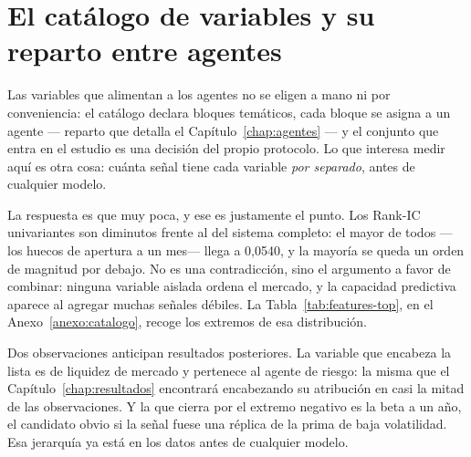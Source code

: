 \section{El catálogo de variables y su reparto entre agentes}

Las variables que alimentan a los agentes no se eligen a mano ni por conveniencia: el catálogo
declara bloques temáticos, cada bloque se asigna a un agente --- reparto que detalla el
Capítulo~\ref{chap:agentes} --- y el conjunto que entra en el estudio es una decisión del propio
protocolo. Lo que interesa medir aquí es otra cosa: cuánta señal tiene cada variable
\emph{por separado}, antes de cualquier modelo.

La respuesta es que muy poca, y ese es justamente el punto. Los Rank-IC univariantes son diminutos
frente al \RankICSeleccion{} del sistema completo: el mayor de todos ---los huecos de apertura a un
mes--- llega a 0,0540, y la mayoría se queda un orden de magnitud por debajo. No es una
contradicción, sino el argumento a favor de combinar: ninguna variable aislada ordena el mercado, y
la capacidad predictiva aparece al agregar muchas señales débiles. La
Tabla~\ref{tab:features-top}, en el Anexo~\ref{anexo:catalogo}, recoge los extremos de esa
distribución.

Dos observaciones anticipan resultados posteriores. La variable que encabeza la lista es de liquidez
de mercado y pertenece al agente de riesgo: la misma que el Capítulo~\ref{chap:resultados}
encontrará encabezando su atribución en casi la mitad de las observaciones. Y la que cierra por el extremo negativo es la beta a un año, el
candidato obvio si la señal fuese una réplica de la prima de baja volatilidad. Esa jerarquía ya está
en los datos antes de cualquier modelo.
